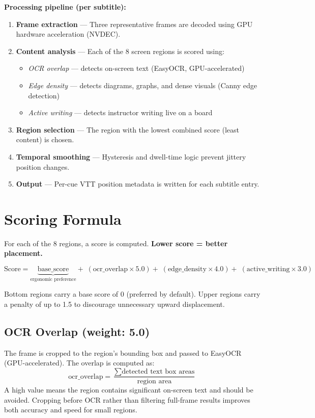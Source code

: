 \documentclass[11pt]{article}
\begin{document}
\textbf{Processing pipeline (per subtitle):}
\begin{enumerate}[leftmargin=1.5em, itemsep=2pt]
    \item \textbf{Frame extraction} --- Three representative frames are decoded using GPU hardware acceleration (NVDEC).
    \item \textbf{Content analysis} --- Each of the 8 screen regions is scored using:
    \begin{itemize}
        \item \textit{OCR overlap} --- detects on-screen text (EasyOCR, GPU-accelerated)
        \item \textit{Edge density} --- detects diagrams, graphs, and dense visuals (Canny edge detection)
        \item \textit{Active writing} --- detects instructor writing live on a board
    \end{itemize}
    \item \textbf{Region selection} --- The region with the lowest combined score (least content) is chosen.
    \item \textbf{Temporal smoothing} --- Hysteresis and dwell-time logic prevent jittery position changes.
    \item \textbf{Output} --- Per-cue VTT position metadata is written for each subtitle entry.
\end{enumerate}

\section{Scoring Formula}
For each of the 8 regions, a score is computed. \textbf{Lower score = better placement.}

\[
\text{Score} = \underbrace{\text{base\_score}}_{\text{ergonomic preference}}
+ \; ({\text{ocr\_overlap} \times 5.0})
+ \; ({\text{edge\_density} \times 4.0})
+ \; ({\text{active\_writing} \times 3.0})
\]

Bottom regions carry a base score of 0 (preferred by default). Upper regions carry a penalty of up to 1.5 to discourage unnecessary upward displacement.

\subsection*{OCR Overlap (weight: 5.0)}
The frame is cropped to the region's bounding box and passed to EasyOCR (GPU-accelerated). The overlap is computed as:
\[
\text{ocr\_overlap} = \frac{\sum \text{detected text box areas}}{\text{region area}}
\]
A high value means the region contains significant on-screen text and should be avoided. Cropping before OCR rather than filtering full-frame results improves both accuracy and speed for small regions.
\end{document}
